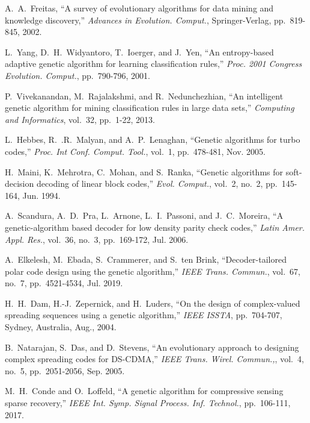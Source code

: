 \documentclass[journal]{IEEEtran}
\numberwithin{const2}{const}
\begin{document}
\begin{thebibliography}{1}
	
	A.~A.~Freitas,
	``A survey of evolutionary algorithms for data mining and knowledge discovery,''
	\emph{Advances in Evolution. Comput.}, Springer-Verlag, pp.~819-845, 2002.
	
	L.~Yang, D.~H.~Widyantoro, T.~Ioerger, and J.~Yen,
	``An entropy-based adaptive genetic algorithm for learning classification rules,''
	\emph{Proc. 2001 Congress Evolution. Comput.}, pp.~790-796, 2001.
	
	P.~Vivekanandan, M.~Rajalakshmi, and R.~Nedunchezhian,
	``An intelligent genetic algorithm for mining classification rules in large data sets,''
	\emph{Computing and Informatics}, vol.~32, pp.~1-22, 2013.
	

	L.~Hebbes, R.~.R.~Malyan, and A.~P.~Lenaghan,
	``Genetic algorithms for turbo codes,''
	\emph{Proc. Int Conf. Comput. Tool.}, vol.~1, pp.~478-481, Nov. 2005.

    H.~Maini, K.~Mehrotra, C.~Mohan, and S.~Ranka,
    ``Genetic algorithms for soft-decision decoding of linear block codes,''
    \emph{Evol. Comput.}, vol.~2, no.~2, pp.~145-164, Jun. 1994.
    
    A.~Scandura, A.~D.~Pra, L.~Arnone, L.~I.~Passoni, and J.~C.~Moreira,
    ``A genetic-algorithm based decoder for low density parity check codes,''
    \emph{Latin Amer. Appl. Res.}, vol.~36, no.~3, pp.~169-172, Jul. 2006.
    
    A.~Elkelesh, M.~Ebada, S.~Crammerer, and S.~ten Brink,
    ``Decoder-tailored polar code design using the genetic algorithm,''
   	\emph{IEEE Trans. Commun.}, vol.~67, no.~7, pp.~4521-4534, Jul. 2019.	
   	
   	H.~H.~Dam, H.-J.~Zepernick, and H.~Luders,
   	``On the design of complex-valued spreading sequences using a genetic algorithm,''
   	\emph{IEEE ISSTA}, pp.~704-707, Sydney, Australia, Aug., 2004.
   	
   	B.~Natarajan, S.~Das, and D.~Stevens,
   	``An evolutionary approach to designing complex spreading codes for DS-CDMA,''
   	\emph{IEEE Trans. Wirel. Commun.,}, vol.~4, no.~5, pp.~2051-2056, Sep. 2005.
   	
    M.~H.~Conde and O.~Loffeld,
    ``A genetic algorithm for compressive sensing sparse recovery,''   	
    \emph{IEEE Int. Symp. Signal Process. Inf. Technol.}, pp.~106-111, 2017.
    

\end{thebibliography}
\end{document}
